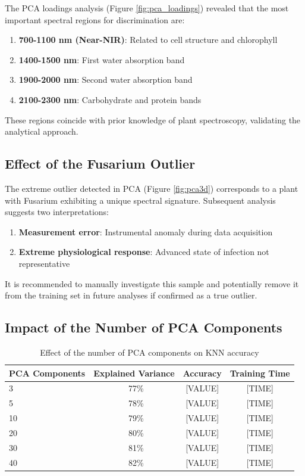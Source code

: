 \documentclass[12pt,a4paper]{article}
\begin{document}
The PCA loadings analysis (Figure \ref{fig:pca_loadings}) revealed that the most important spectral regions for discrimination are:

\begin{enumerate}
    \item \textbf{700-1100 nm (Near-NIR)}: Related to cell structure and chlorophyll
    \item \textbf{1400-1500 nm}: First water absorption band
    \item \textbf{1900-2000 nm}: Second water absorption band
    \item \textbf{2100-2300 nm}: Carbohydrate and protein bands
\end{enumerate}

These regions coincide with prior knowledge of plant spectroscopy, validating the analytical approach.

\subsection{Effect of the Fusarium Outlier}

The extreme outlier detected in PCA (Figure \ref{fig:pca3d}) corresponds to a plant with Fusarium exhibiting a unique spectral signature. Subsequent analysis suggests two interpretations:

\begin{enumerate}
    \item \textbf{Measurement error}: Instrumental anomaly during data acquisition
    \item \textbf{Extreme physiological response}: Advanced state of infection not representative
\end{enumerate}

It is recommended to manually investigate this sample and potentially remove it from the training set in future analyses if confirmed as a true outlier.

\subsection{Impact of the Number of PCA Components}

\begin{table}[H]
\centering
\caption{Effect of the number of PCA components on KNN accuracy}
\label{tab:pca_components}
\begin{tabular}{lccc}
\toprule
\textbf{PCA Components} & \textbf{Explained Variance} & \textbf{Accuracy} & \textbf{Training Time} \\
\midrule
3 & ~77\% & [VALUE] & [TIME] \\
5 & ~78\% & [VALUE] & [TIME] \\
10 & ~79\% & [VALUE] & [TIME] \\
20 & ~80\% & [VALUE] & [TIME] \\
30 & ~81\% & [VALUE] & [TIME] \\
40 & ~82\% & [VALUE] & [TIME] \\
\bottomrule
\end{tabular}
\end{table}
\end{document}

